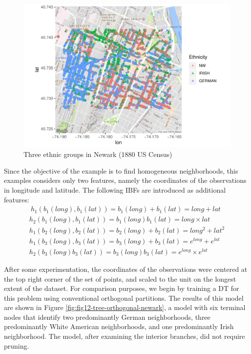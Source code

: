 \documentclass[]{elsarticle} %
\makeatletter
\def\maxwidth{\ifdim\Gin@nat@width>\linewidth\linewidth
\else\Gin@nat@width\fi}
\let\Oldincludegraphics\includegraphics
\renewcommand{\includegraphics}[1]{\Oldincludegraphics[width=\maxwidth]{#1}}
\makeatother
\begin{document}
\begin{figure}
\centering
\includegraphics{Trees_with_Base_Functions_v2_files/figure-latex/fig11-map-newark-1.pdf}
\caption{\label{fig:fig11-map-newark}Three ethnic groups in Newark (1880
US Census)}
\end{figure}

Since the objective of the example is to find homogeneous neighborhoods,
this examples considers only two features, namely the coordinates of the
observations in longitude and latitude. The following IBFs are
introduced as additional features: \[
\begin{array}{c}\
h_1(b_1(long),b_1(lat))=b_1(long)+b_1(lat)=long+lat\\
h_2(b_1(long),b_1(lat))=b_1(long)b_1(lat)=long\times lat\\
h_1(b_2(long),b_2(lat))=b_2(long)+b_2(lat)=long^2+lat^2\\
h_1(b_3(long),b_3(lat))=b_3(long)+b_3(lat)=e^{long}+e^{lat}\\
h_2(b_3(long)b_3(lat))=b_3(long)b_3(lat)=e^{long}\times e^{lat}
\end{array}
\]

After some experimentation, the coordinates of the observations were
centered at the top right corner of the set of points, and scaled to the
unit on the longest extent of the dataset. For comparison purposes, we
begin by training a DT for this problem using conventional orthogonal
partitions. The results of this model are shown in Figure
\ref{fig:fig12-tree-orthogonal-newark}, a model with six terminal nodes
that identify two predominantly German neighborhoods, three
predominantly White American neighborhoods, and one predominantly Irish
neighborhood. The model, after examining the interior branches, did not
require pruning.
\end{document}
